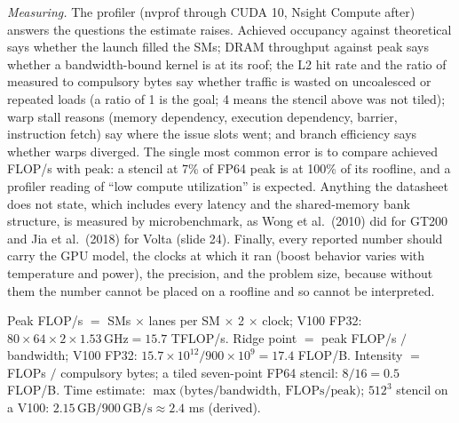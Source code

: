 \documentclass[11pt,letterpaper]{article}
\newenvironment{formulas}{\begin{tcolorbox}[formulabox]}{\end{tcolorbox}}
\begin{document}
\emph{Measuring.} The profiler (nvprof through CUDA 10, Nsight Compute after) answers the questions the estimate raises. Achieved occupancy against theoretical says whether the launch filled the SMs; DRAM throughput against peak says whether a bandwidth-bound kernel is at its roof; the L2 hit rate and the ratio of measured to compulsory bytes say whether traffic is wasted on uncoalesced or repeated loads (a ratio of 1 is the goal; 4 means the stencil above was not tiled); warp stall reasons (memory dependency, execution dependency, barrier, instruction fetch) say where the issue slots went; and branch efficiency says whether warps diverged. The single most common error is to compare achieved FLOP/s with peak: a stencil at 7\% of FP64 peak is at 100\% of its roofline, and a profiler reading of ``low compute utilization'' is expected. Anything the datasheet does not state, which includes every latency and the shared-memory bank structure, is measured by microbenchmark, as Wong et al.\ (2010) did for GT200 and Jia et al.\ (2018) for Volta (slide 24). Finally, every reported number should carry the GPU model, the clocks at which it ran (boost behavior varies with temperature and power), the precision, and the problem size, because without them the number cannot be placed on a roofline and so cannot be interpreted.

\begin{formulas}
Peak FLOP/s $=$ SMs $\times$ lanes per SM $\times$ 2 $\times$ clock; V100 FP32: $80 \times 64 \times 2 \times 1.53\,\text{GHz} = 15.7$ TFLOP/s. Ridge point $=$ peak FLOP/s $/$ bandwidth; V100 FP32: $15.7 \times 10^{12} / 900 \times 10^{9} = 17.4$ FLOP/B. Intensity $=$ FLOPs $/$ compulsory bytes; a tiled seven-point FP64 stencil: $8 / 16 = 0.5$ FLOP/B. Time estimate: $\max\bigl(\text{bytes}/\text{bandwidth},\ \text{FLOPs}/\text{peak}\bigr)$; $512^3$ stencil on a V100: $2.15\,\text{GB} / 900\,\text{GB/s} \approx 2.4$ ms (derived).
\end{formulas}
\end{document}
